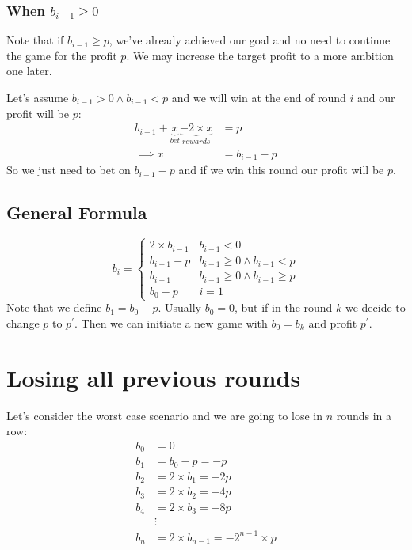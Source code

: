 \documentclass{book}
\begin{document}
	\subsubsection{When $b_{i - 1} \ge 0$}
	Note that if $b_{i - 1} \ge p$, we've already achieved our goal and no need to continue the game for the profit $p$. We may increase the target profit to a more ambition one later.
	\par Let's assume $b_{i - 1} > 0 \land b_{i - 1} < p$ and we will win at the end of round $i$ and our profit will be $p$:
	\begin{equation*}
		\begin{split}
			b_{i - 1} + \underbrace{x}_{bet} \underbrace{- 2 \times x}_{rewards} &=  p \\
			\implies x &= b_{i - 1} - p
		\end{split}
	\end{equation*}
	So we just need to bet on $b_{i - 1} - p$ and if we win this round our profit will be $p$.
	\subsection{General Formula}
	\begin{equation*}
		b_i = \begin{cases}
			2 \times b_{i - 1} & b_{i - 1} < 0 \\
			b_{i - 1} - p & b_{i - 1} \ge 0 \land b_{i - 1} < p \\
			b_{i - 1} & b_{i - 1} \ge 0 \land b_{i - 1} \ge p \\
			b_0 -p & i = 1
		\end{cases}	
	\end{equation*}
	Note that we define $b_1 = b_0 - p$. Usually $b_0 = 0$, but if in the round $k$ we decide to change $p$ to $p^{\prime}$. Then we can initiate a new game with $b_0 = b_k$ and profit $p^\prime$.  
	\section{Losing all previous rounds}
	Let's consider the worst case scenario and we are going to lose in $n$ rounds in a row:
	\begin{equation*}
		\begin{split}
			b_0 &= 0 \\
			b_1 &= b_0 - p = -p \\
			b_2 &= 2 \times b_1 = -2p \\
			b_3 &= 2 \times b_2 = -4p \\
			b_4 &= 2 \times b_3 = -8p \\
			&\vdots \\
			b_{n} &= 2 \times b_{n - 1} = -2^{n - 1} \times p
	     \end{split}
	\end{equation*}
\end{document}

